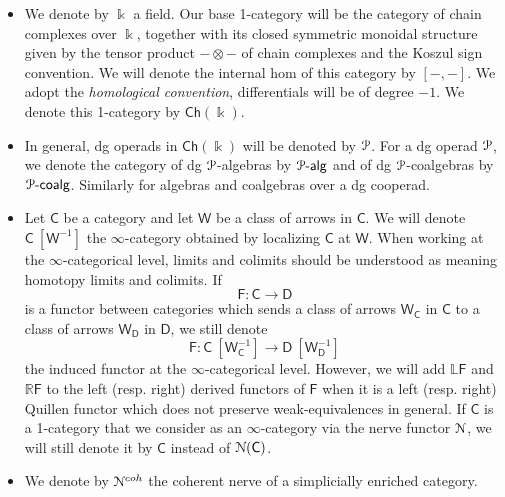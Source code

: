 \documentclass[a4paper,12pt]{amsart}
\renewcommand{\mathcal}{\EuScript}
\theoremstyle{plain}
\theoremstyle{definition}
\theoremstyle{remark}
\newcommand{\kk}{\Bbbk}
\begin{document}
\begin{itemize}
    \item We denote by $\kk$ a field. Our base 1-category will be the category of chain complexes over $\kk$, together with its closed symmetric monoidal structure given by the tensor product $-\otimes-$ of chain complexes and the Koszul sign convention. We will denote the internal hom of this category by $[-,-]$. We adopt the \textit{homological convention}, differentials will be of degree $-1$. We denote this 1-category by $\mathsf{Ch}(\kk)$. 
    
    
    \item In general, dg operads in $\mathsf{Ch}(\kk)$ will be denoted by $\mathcal{P}$. For a dg operad $\mathcal{P}$, we denote the category of dg $\mathcal{P}$-algebras by $\mathcal{P}\text{-}\mathsf{alg}$ and of dg $\mathcal{P}$-coalgebras by $\mathcal{P}\text{-}\mathsf{coalg}$. Similarly for algebras and coalgebras over a dg cooperad.
    
    
    \item Let $\mathsf{C}$ be a category and let $\mathsf{W}$ be a class of arrows in $\mathsf{C}$. We will denote $\mathsf{C}~[\mathsf{W}^{-1}]$ the $\infty$-category obtained by localizing $\mathsf{C}$ at $\mathsf{W}$. When working at the $\infty$-categorical level, limits and colimits should be understood as meaning homotopy limits and colimits. If
\[
\mathsf{F}: \mathsf{C} \longrightarrow \mathsf{D}
\]
is a functor between categories which sends a class of arrows $\mathsf{W}_{\mathsf{C}}$ in $\mathsf{C}$ to a class of arrows $\mathsf{W}_{\mathsf{D}}$ in $\mathsf{D}$, we still denote 
\[
\mathsf{F}: \mathsf{C}~[\mathsf{W}^{-1}_{\mathsf{C}}] \longrightarrow \mathsf{D}~[\mathsf{W}^{-1}_{\mathsf{D}}]
\]
the induced functor at the $\infty$-categorical level. However, we will add $\mathbb{L}\mathsf{F}$ and $\mathbb{R}\mathsf{F}$ to the left (resp. right) derived functors of $\mathsf{F}$ when it is a left (resp. right) Quillen functor which does not preserve weak-equivalences in general. If $\mathsf{C}$ is a 1-category that we consider as an $\infty$-category via the nerve functor $\mathcal{N}$, we will still denote it by $\mathsf{C}$ instead of $\mathcal{N}(\mathsf{C})$.


    \item We denote by $\mathcal{N}^{coh}$ the coherent nerve of a simplicially enriched category.


\end{itemize}
\end{document}
